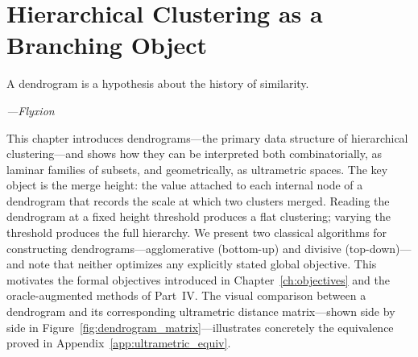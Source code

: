 \chapter{Hierarchical Clustering as a Branching Object}
\label{ch:dendrograms}

\epigraph{%
  A dendrogram is a hypothesis about the history of similarity.%
}{\textit{---Flyxion}}

This chapter introduces dendrograms---the primary data structure of hierarchical clustering---and shows how they can be interpreted both combinatorially, as laminar families of subsets, and geometrically, as ultrametric spaces. The key object is the merge height: the value attached to each internal node of a dendrogram that records the scale at which two clusters merged. Reading the dendrogram at a fixed height threshold produces a flat clustering; varying the threshold produces the full hierarchy. We present two classical algorithms for constructing dendrograms---agglomerative (bottom-up) and divisive (top-down)---and note that neither optimizes any explicitly stated global objective. This motivates the formal objectives introduced in Chapter~\ref{ch:objectives} and the oracle-augmented methods of Part~IV. The visual comparison between a dendrogram and its corresponding ultrametric distance matrix---shown side by side in Figure~\ref{fig:dendrogram_matrix}---illustrates concretely the equivalence proved in Appendix~\ref{app:ultrametric_equiv}.


